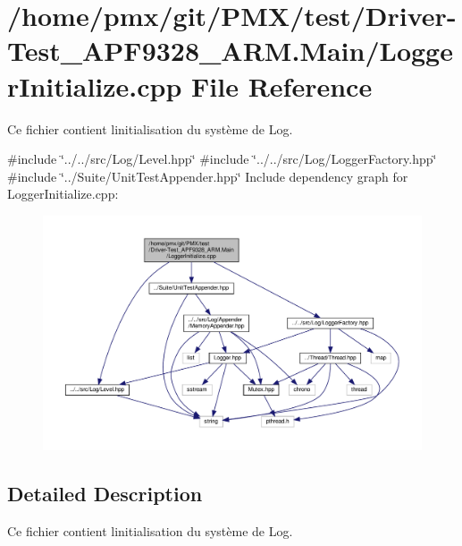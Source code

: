 \hypertarget{test_2Driver-Test__APF9328__ARM_8Main_2LoggerInitialize_8cpp}{}\section{/home/pmx/git/\+P\+M\+X/test/\+Driver-\/\+Test\+\_\+\+A\+P\+F9328\+\_\+\+A\+RM.Main/\+Logger\+Initialize.cpp File Reference}
\label{test_2Driver-Test__APF9328__ARM_8Main_2LoggerInitialize_8cpp}


Ce fichier contient l\textquotesingle{}initialisation du système de Log.  


{\ttfamily \#include \char`\"{}../../src/\+Log/\+Level.\+hpp\char`\"{}}\newline
{\ttfamily \#include \char`\"{}../../src/\+Log/\+Logger\+Factory.\+hpp\char`\"{}}\newline
{\ttfamily \#include \char`\"{}../\+Suite/\+Unit\+Test\+Appender.\+hpp\char`\"{}}\newline
Include dependency graph for Logger\+Initialize.\+cpp\+:
\nopagebreak
\begin{figure}[H]
\begin{center}
\leavevmode
\includegraphics[width=350pt]{test_2Driver-Test__APF9328__ARM_8Main_2LoggerInitialize_8cpp__incl}
\end{center}
\end{figure}


\subsection{Detailed Description}
Ce fichier contient l\textquotesingle{}initialisation du système de Log. 

